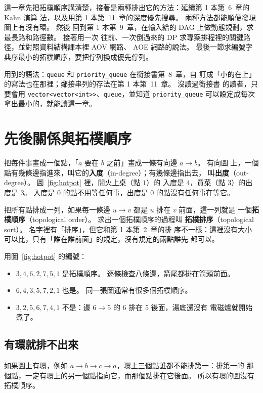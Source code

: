 這一章先把拓樸順序講清楚，接著是兩種排出它的方法：延續第 1 本第~6~章的 Kahn 演算
法，以及用第 1 本第~11~章的深度優先搜尋。 兩種方法都能順便發現圖上有沒有環。 然後
回到第 1 本第~9~章，在輸入給的 DAG 上做動態規劃，求最長路和路徑數。 接著用一次
往前、一次倒過來的 DP 求專案排程裡的關鍵路徑，並對照資料結構課本裡 AOV 網路、
AOE 網路的說法。 最後一節求編號字典序最小的拓樸順序，要把佇列換成優先佇列。

用到的語法：\texttt{queue} 和 \texttt{priority\_queue} 在銜接書第~8~章，自
訂成「小的在上」的寫法也在那裡；鄰接串列的存法在第 1 本第~11~章。 沒讀過銜接書
的讀者，只要會用 \texttt{vector<vector<int>>}、\texttt{queue}，並知道
\texttt{priority\_queue} 可以設定成每次拿出最小的，就能讀這一章。

\section{先後關係與拓樸順序}
\label{sec:topo-order}

把每件事畫成一個點，「$a$ 要在 $b$ 之前」畫成一條有向邊 $a \to b$。 有向圖
上，一個點有幾條邊指進來，叫它的\textbf{入度}（in-degree）；有幾條邊指出去，
叫\textbf{出度}（out-degree）。 圖~\ref{fig:hotpot} 裡，開火上桌（點 $1$）的
入度是 $4$，買菜（點 $3$）的出度是 $3$。 入度是 $0$ 的點不用等任何事，出度是
$0$ 的點沒有任何事在等它。

把所有點排成一列，如果每一條邊 $u \to v$ 都是 $u$ 排在 $v$ 前面，這一列就是
一個\textbf{拓樸順序}（topological order）。 求出一個拓樸順序的過程叫
\textbf{拓樸排序}（topological sort）。 名字裡有「排序」，但它和第 1 本第~2~章的排
序不一樣：這裡沒有大小可以比，只有「誰在誰前面」的規定，沒有規定的兩點誰先
都可以。

用圖~\ref{fig:hotpot} 的編號：

\begin{itemize}
\item $3, 4, 6, 2, 7, 5, 1$ 是拓樸順序。 逐條檢查八條邊，箭尾都排在箭頭前面。
\item $6, 4, 3, 5, 7, 2, 1$ 也是。 同一張圖通常有很多個拓樸順序。
\item $3, 2, 5, 6, 7, 4, 1$ 不是：邊 $6 \to 5$ 的 $6$ 排在 $5$ 後面，湯底還沒有
電磁爐就開始煮了。
\end{itemize}

\subsection{有環就排不出來}

如果圖上有環，例如 $a \to b \to c \to a$，環上三個點誰都不能排第一：排第一的
那個點，一定有環上的另一個點指向它，而那個點排在它後面。 所以有環的圖沒有
拓樸順序。

